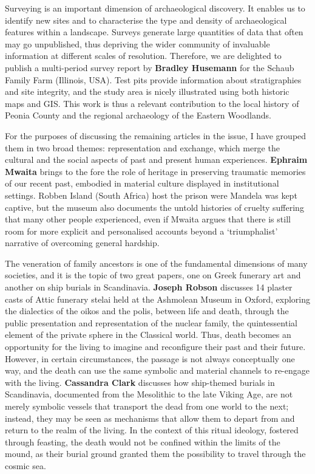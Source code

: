Surveying is an important dimension of archaeological discovery. It enables us to identify new sites and to characterise the type and density of archaeological features within a landscape. Surveys generate large quantities of data that often may go unpublished, thus depriving the wider community of invaluable information at different scales of resolution. Therefore, we are delighted to publish a multi-period survey report by \textbf{Bradley Husemann} for the Schaub Family Farm (Illinois, USA). Test pits provide information about stratigraphies and site integrity, and the study area is nicely illustrated using both historic maps and GIS. This work is thus a relevant contribution to the local history of Peonia County and the regional archaeology of the Eastern Woodlands.

For the purposes of discussing the remaining articles in the issue, I have grouped them in two broad themes: representation and exchange, which merge the cultural and the social aspects of past and present human experiences. \textbf{Ephraim Mwaita} brings to the fore the role of heritage in preserving traumatic memories of our recent past, embodied in material culture displayed in institutional settings. Robben Island (South Africa) host the prison were Mandela was kept captive, but the museum also documents the untold histories of cruelty suffering that many other people experienced, even if Mwaita argues that there is still room for more explicit and personalised accounts beyond a ‘triumphalist’ narrative of overcoming general hardship.

The veneration of family ancestors is one of the fundamental dimensions of many societies, and it is the topic of two great papers, one on Greek funerary art and another on ship burials in Scandinavia. \textbf{Joseph Robson} discusses 14 plaster casts of Attic funerary stelai held at the Ashmolean Museum in Oxford, exploring the dialectics of the oikos and the polis, between life and death, through the public presentation and representation of the nuclear family, the quintessential element of the private sphere in the Classical world. Thus, death becomes an opportunity for the living to imagine and reconfigure their past and their future. However, in certain circumstances, the passage is not always conceptually one way, and the death can use the same symbolic and material channels to re-engage with the living. \textbf{Cassandra Clark} discusses how ship-themed burials in Scandinavia, documented from the Mesolithic to the late Viking Age, are not merely symbolic vessels that transport the dead from one world to the next; instead, they may be seen as mechanisms that allow them to depart from and return to the realm of the living. In the context of this ritual ideology, fostered through feasting, the death would not be confined within the limits of the mound, as their burial ground granted them the possibility to travel through the cosmic sea.

